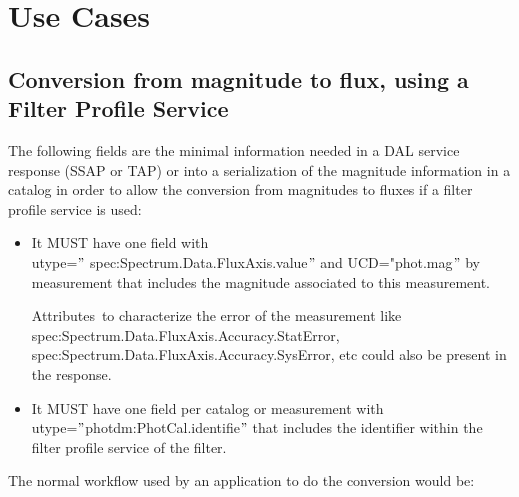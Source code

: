 \documentclass[11pt,a4paper]{ivoa}
\begin{document}
\section{Use Cases}
\subsection{Conversion from magnitude to flux, using a Filter Profile Service}
The following fields are the minimal information needed in a DAL service response (SSAP or TAP) or into a serialization of the magnitude information in a catalog in order to allow the conversion from magnitudes to fluxes if a filter profile service is used:
\par

\begin{itemize}
	\item It MUST have one field with\\ utype=$"$ spec:Spectrum.Data.FluxAxis.value$"$  and UCD="phot.mag$"$  by measurement that includes the magnitude associated to this measurement. \par

Attributes\ to characterize the error of the measurement like\\  spec:Spectrum.Data.FluxAxis.Accuracy.StatError,\\ spec:Spectrum.Data.FluxAxis.Accuracy.SysError, etc could also be present in the response.
\par

	\item It MUST have one field per catalog or measurement with\\ utype=$"$photdm:PhotCal.identifie$"$  that includes the identifier within the filter profile service of the filter.
\end{itemize}\par

The normal workflow used by an application to do the conversion would be:
\par
\end{document}
